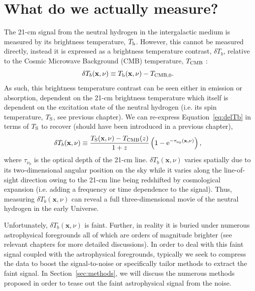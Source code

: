 \section{What do we actually measure?}

The 21-cm signal from the neutral hydrogen in the intergalactic medium is measured by its brightness temperature, $T_{\rm b}$. However, this cannot be measured directly, instead it is expressed as a brightness temperature contrast, $\delta T_{b}$, relative to the Cosmic Microwave Background (CMB) temperature, $T_{\rm CMB}$ \cite{Furlanetto:2006a}: 
\begin{equation} \label{eq:delTb}
\delta T_{b}(\mathbf{x},\nu) \equiv T_{\rm b}(\mathbf{x},\nu) - T_{\rm CMB, 0}.
\end{equation}
As such, this brightness temperature contrast can be seen either in emission or absorption, dependent on the 21-cm brightness temperature which itself is dependent on the excitation state of the neutral hydrogen (i.e. its spin temperature, $T_{\rm S}$, see {\color{red} previous chapter}). We can re-express Equation~\ref{eq:delTb} in terms of $T_{\rm S}$ to recover {\color{red} (should have been introduced in a previous chapter)},
\begin{equation} \label{eq:delTb_Ts}
\delta T_{b}(\mathbf{x},\nu) \equiv \frac{T_{\rm S}(\mathbf{x},\nu) - T_{\rm CMB}(z)}{1+z} \left( 1 - {\rm e}^{-\tau_{\nu_{0}}(\mathbf{x},\nu) } \right),
\end{equation}
where $\tau_{\nu_{0}}$ is the optical depth of the 21-cm line. $\delta T_{b}(\mathbf{x},\nu)$ varies spatially due to its two-dimensional angular position on the sky while it varies along the line-of-sight direction owing to the 21-cm line being redshifted by cosmological expansion (i.e. adding a frequency or time dependence to the signal). Thus, measuring $\delta T_{b}(\mathbf{x},\nu)$ can reveal a full three-dimensional movie of the neutral hydrogen in the early Universe.

Unfortunately, $\delta T_{b}(\mathbf{x},\nu)$ is faint. Further, in reality it is buried under numerous astrophysical foregrounds all of which are orders of magnitude brighter {\color{red} (see relevant chapters for more detailed discussions)}. In order to deal with this faint signal coupled with the astrophysical foregrounds, typically we seek to compress the data to boost the signal-to-noise or specifically tailor methods to extract the faint signal. In Section~\ref{sec:methods}, we will discuss the numerous methods proposed in order to tease out the faint astrophysical signal from the noise.

